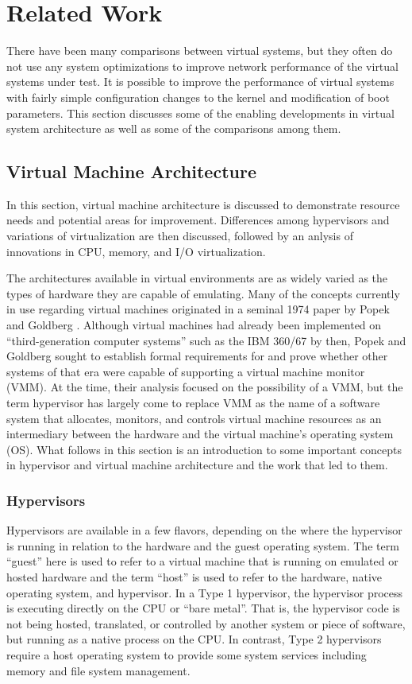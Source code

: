 \chapter{Related Work}
\label{sec:related_work}
There have been many comparisons between virtual systems, but they often do not use any system optimizations to improve network performance of the virtual systems under test.
It is possible to improve the performance of virtual systems with fairly simple configuration changes to the kernel and modification of boot parameters.
This section discusses some of the enabling developments in virtual system architecture as well as some of the comparisons among them.  

\section{Virtual Machine Architecture}
\label{sec:vmarchitecture}
In this section, virtual machine architecture is discussed to demonstrate resource needs and potential areas for improvement.
Differences among hypervisors and variations of virtualization are then discussed, followed by an anlysis of innovations in CPU, memory, and I/O virtualization.  

The architectures available in virtual environments are as widely varied as the types of hardware they are capable of emulating.
Many of the concepts currently in use regarding virtual machines originated in a seminal 1974 paper by Popek and Goldberg \autocite{popek1974formal}.
Although virtual machines had already been implemented on ``third-generation computer systems'' such as the IBM 360/67 by then, Popek and Goldberg sought to establish formal requirements for and prove whether other systems of that era were capable of supporting a virtual machine monitor (VMM)\autocite{popek1974formal}.
At the time, their analysis focused on the possibility of a VMM, but the term hypervisor has largely come to replace VMM as the name of a software system that allocates, monitors, and controls virtual machine resources as an intermediary between the hardware and the virtual machine's operating system (OS).
What follows in this section is an introduction to some important concepts in hypervisor and virtual machine architecture and the work that led to them.

\subsection{Hypervisors}
\label{sec:hypervisors}
Hypervisors are available in a few flavors, depending on the where the hypervisor is running in relation to the hardware and the guest operating system.
The term ``guest'' here is used to refer to a virtual machine that is running on emulated or hosted hardware and the term ``host'' is used to refer to the hardware, native operating system, and hypervisor.  
In a Type 1 hypervisor, the hypervisor process is executing directly on the CPU or ``bare metal''.
That is, the hypervisor code is not being hosted, translated, or controlled by another system or piece of software, but running as a native process on the CPU.
In contrast, Type 2 hypervisors require a host operating system to provide some system services including memory and file system management.


